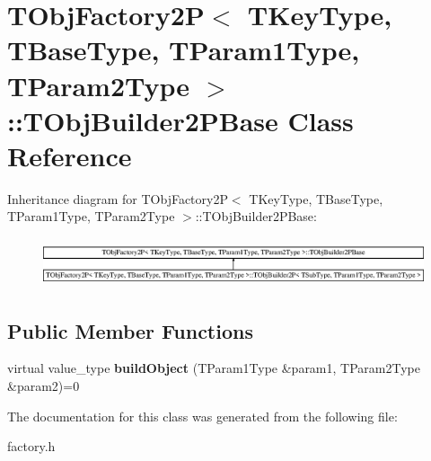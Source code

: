 \hypertarget{class_t_obj_factory2_p_1_1_t_obj_builder2_p_base}{\section{T\+Obj\+Factory2\+P$<$ T\+Key\+Type, T\+Base\+Type, T\+Param1\+Type, T\+Param2\+Type $>$\+:\+:T\+Obj\+Builder2\+P\+Base Class Reference}
\label{class_t_obj_factory2_p_1_1_t_obj_builder2_p_base}
}
Inheritance diagram for T\+Obj\+Factory2\+P$<$ T\+Key\+Type, T\+Base\+Type, T\+Param1\+Type, T\+Param2\+Type $>$\+:\+:T\+Obj\+Builder2\+P\+Base\+:\begin{figure}[H]
\begin{center}
\leavevmode
\includegraphics[height=1.443299cm]{class_t_obj_factory2_p_1_1_t_obj_builder2_p_base}
\end{center}
\end{figure}
\subsection*{Public Member Functions}
\begin{DoxyCompactItemize}
\item 
\hypertarget{class_t_obj_factory2_p_1_1_t_obj_builder2_p_base_a2109d7c10e6ad95fcc341232057322e8}{virtual value\+\_\+type {\bfseries build\+Object} (T\+Param1\+Type \&param1, T\+Param2\+Type \&param2)=0}\label{class_t_obj_factory2_p_1_1_t_obj_builder2_p_base_a2109d7c10e6ad95fcc341232057322e8}

\end{DoxyCompactItemize}


The documentation for this class was generated from the following file\+:\begin{DoxyCompactItemize}
\item 
factory.\+h\end{DoxyCompactItemize}
